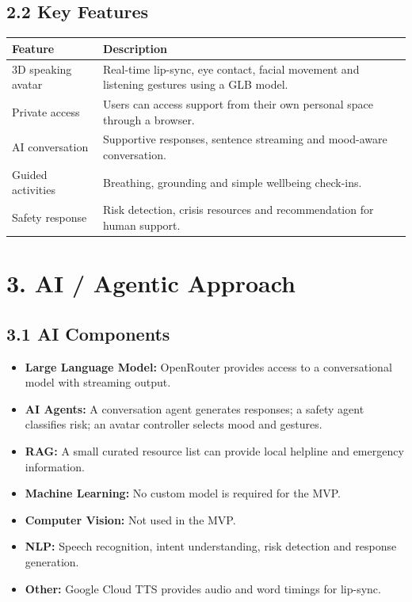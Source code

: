 \documentclass[9pt,a4paper]{article}
\begin{document}
\subsection*{2.2 Key Features}

\begin{tabularx}{\textwidth}{@{}p{3.4cm}Y@{}}
\textbf{Feature} & \textbf{Description} \\
\hline
3D speaking avatar & Real-time lip-sync, eye contact, facial movement and
listening gestures using a GLB model. \\
Private access & Users can access support from their own personal space through
a browser. \\
AI conversation & Supportive responses, sentence streaming and mood-aware
conversation. \\
Guided activities & Breathing, grounding and simple wellbeing check-ins. \\
Safety response & Risk detection, crisis resources and recommendation for human
support. \\
\end{tabularx}

\section*{3. AI / Agentic Approach}

\subsection*{3.1 AI Components}

\begin{itemize}
  \item \textbf{Large Language Model:} OpenRouter provides access to a
        conversational model with streaming output.
  \item \textbf{AI Agents:} A conversation agent generates responses; a safety
        agent classifies risk; an avatar controller selects mood and gestures.
  \item \textbf{RAG:} A small curated resource list can provide local helpline
        and emergency information.
  \item \textbf{Machine Learning:} No custom model is required for the MVP.
  \item \textbf{Computer Vision:} Not used in the MVP.
  \item \textbf{NLP:} Speech recognition, intent understanding, risk detection
        and response generation.
  \item \textbf{Other:} Google Cloud TTS provides audio and word timings for
        lip-sync.
\end{itemize}
\end{document}
